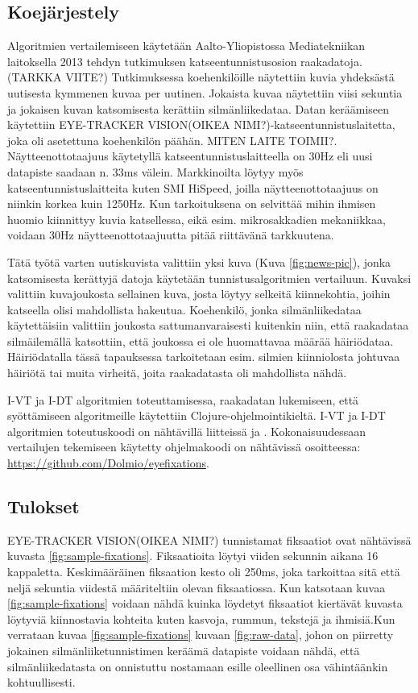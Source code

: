 \subsection{Koejärjestely}
Algoritmien vertailemiseen käytetään Aalto-Yliopistossa Mediatekniikan laitoksella 2013 tehdyn tutkimuksen katseentunnistusosion raakadatoja.(TARKKA VIITE?) Tutkimuksessa koehenkilöille näytettiin kuvia yhdeksästä uutisesta kymmenen kuvaa per uutinen. Jokaista kuvaa näytettiin viisi sekuntia ja jokaisen kuvan katsomisesta kerättiin silmänliikedataa. Datan keräämiseen käytettiin EYE-TRACKER VISION(OIKEA NIMI?)-katseentunnistuslaitetta, joka oli asetettuna koehenkilön päähän. MITEN LAITE TOIMII?. Näytteenottotaajuus käytetyllä katseentunnistuslaitteella on 30Hz eli uusi datapiste saadaan n. 33ms välein. Markkinoilta löytyy myös katseentunnistuslaitteita kuten SMI HiSpeed, joilla näytteenottotaajuus on niinkin korkea kuin 1250Hz.\citep[s.197]{nystrom2010} Kun tarkoituksena on selvittää mihin ihmisen huomio kiinnittyy kuvia katsellessa, eikä esim. mikrosakkadien mekaniikkaa, voidaan 30Hz näytteenottotaajuutta pitää riittävänä tarkkuutena.

Tätä työtä varten uutiskuvista valittiin yksi kuva (Kuva \ref{fig:news-pic}), jonka katsomisesta kerättyjä datoja käytetään tunnistusalgoritmien vertailuun. Kuvaksi valittiin kuvajoukosta sellainen kuva, josta löytyy selkeitä kiinnekohtia, joihin katseella olisi mahdollista hakeutua. Koehenkilö, jonka silmänliikedataa käytettäisiin valittiin joukosta sattumanvaraisesti kuitenkin niin, että raakadataa silmäilemällä katsottiin, että joukossa ei ole huomattavaa määrää häiriödataa. Häiriödatalla tässä tapauksessa tarkoitetaan esim. silmien kiinniolosta johtuvaa häiriötä tai muita virheitä, joita raakadatasta oli mahdollista nähdä.

I-VT ja I-DT algoritmien toteuttamisessa, raakadatan lukemiseen, että syöttämiseen algoritmeille käytettiin Clojure-ohjelmointikieltä. I-VT ja I-DT algoritmien toteutuskoodi on nähtävillä liitteissä \emph{} ja \emph{}. Kokonaisuudessaan vertailujen tekemiseen käytetty ohjelmakoodi on nähtävissä osoitteessa: \href{https://github.com/Dolmio/eyefixations}{https://github.com/Dolmio/eyefixations}. 

\subsection{Tulokset}

EYE-TRACKER VISION(OIKEA NIMI?) tunnistamat fiksaatiot ovat nähtävissä kuvasta \ref{fig:sample-fixations}. Fiksaatioita löytyi viiden sekunnin aikana 16 kappaletta. Keskimääräinen fiksaation kesto oli 250ms, joka tarkoittaa sitä että neljä sekuntia viidestä määriteltiin olevan fiksaatiossa. Kun katsotaan kuvaa \ref{fig:sample-fixations} voidaan nähdä kuinka löydetyt fiksaatiot kiertävät kuvasta löytyviä kiinnostavia kohteita kuten kasvoja, rummun, tekstejä ja ihmisiä.Kun verrataan kuvaa \ref{fig:sample-fixations} kuvaan \ref{fig:raw-data}, johon on piirretty jokainen silmänliiketunnistimen keräämä datapiste voidaan nähdä, että silmänliikedatasta on onnistuttu nostamaan esille oleellinen osa vähintäänkin kohtuullisesti.    

